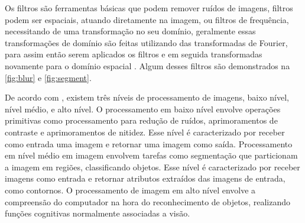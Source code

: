 Os filtros são ferramentas básicas que podem remover ruídos de imagens, filtros podem ser espaciais, atuando diretamente na imagem, ou filtros de frequência, necessitando de uma transformação no seu domínio, geralmente essas transformações de domínio são feitas utilizando das transformadas de Fourier, para assim então serem aplicados os filtros e em seguida transformadas novamente para o domínio espacial \cite{marengoni:2009}. Algum desses filtros são demonstrados na \autoref{fig:blur} e \autoref{fig:segment}.


De acordo com , existem três níveis de processamento de imagens, baixo nível, nível médio, e alto nível. O processamento em baixo nível envolve operações primitivas como processamento para redução de ruídos, aprimoramentos de contraste e aprimoramentos de nitidez. Esse nível é caracterizado por receber como entrada uma imagem e retornar uma imagem como saída. Processamento em nível médio em imagem envolvem tarefas como segmentação que particionam a imagem em regiões, classificando objetos. Esse nível é caracterizado por receber imagens como entrada e retornar atributos extraídos das imagens de entrada, como contornos. O processamento de imagem em alto nível envolve a compreensão do computador na hora do reconhecimento de objetos, realizando funções cognitivas normalmente associadas a visão.

